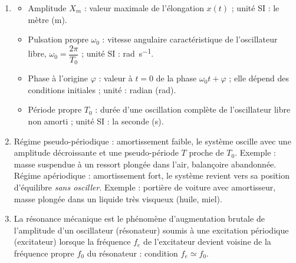 \documentclass[11pt]{article}
\newcommand{\cle}[1]{{\popxbold\color{popdark}#1}}
\begin{document}
\begin{corrige}
\begin{enumerate}
\item \begin{itemize}
\item \cle{Amplitude} $X_m$ : valeur maximale de l'élongation $x(t)$ ; unité SI : le mètre (\si{m}).
\item \cle{Pulsation propre} $\omega_0$ : vitesse angulaire caractéristique de l'oscillateur libre, $\omega_0 = \dfrac{2\pi}{T_0}$ ; unité SI : \si{rad.s^{-1}}.
\item \cle{Phase à l'origine} $\varphi$ : valeur à $t=0$ de la phase $\omega_0 t + \varphi$ ; elle dépend des conditions initiales ; unité : radian (\si{rad}).
\item \cle{Période propre} $T_0$ : durée d'une oscillation complète de l'oscillateur libre non amorti ; unité SI : la seconde (\si{s}).
\end{itemize}
\item \cle{Régime pseudo-périodique} : amortissement faible, le système oscille avec une amplitude décroissante et une pseudo-période $T$ proche de $T_0$. Exemple : masse suspendue à un ressort plongée dans l'air, balançoire abandonnée. \cle{Régime apériodique} : amortissement fort, le système revient vers sa position d'équilibre \emph{sans osciller}. Exemple : portière de voiture avec amortisseur, masse plongée dans un liquide très visqueux (huile, miel).
\item La \cle{résonance mécanique} est le phénomène d'augmentation brutale de l'amplitude d'un oscillateur (résonateur) soumis à une excitation périodique (excitateur) lorsque la fréquence $f_e$ de l'excitateur devient voisine de la fréquence propre $f_0$ du résonateur : condition $f_e \simeq f_0$.
\end{enumerate}
\end{corrige}
\end{document}
